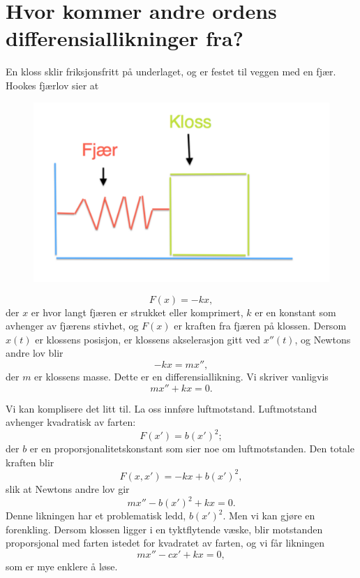 \section*{Hvor kommer andre ordens differensiallikninger fra?}
En kloss sklir friksjonsfritt p{\aa} underlaget, og er festet til veggen med en fj{\ae}r. Hookes fj{\ae}rlov sier at 
\begin{figure}[htbp]
  \begin{center}
	\includegraphics[scale=.35]{Hooke.pdf}
	\label{fig:Num1}
	\end{center}
\end{figure}
\[
F(x)=-kx,
\]
der $x$ er hvor langt fj{\ae}ren er strukket eller komprimert, 
$k$ er en konstant som avhenger av fj{\ae}rens stivhet, 
og $F(x)$ er kraften fra fj{\ae}ren p{\aa} klossen. 
Dersom $x(t)$ er klossens posisjon, er klossens akselerasjon gitt ved $x''(t)$,
og Newtons andre lov blir
\begin{equation*}
-kx=mx'',
\end{equation*}
der $m$ er klossens masse. Dette er en differensiallikning. Vi skriver vanligvis
\[
mx''+kx=0.
\]

Vi kan komplisere det litt til. La oss innf{\o}re luftmotstand. Luftmotstand avhenger kvadratisk av farten:
\begin{equation*}
F(x')=b(x')^{2};
\end{equation*}
der $b$ er en proporsjonalitetskonstant som sier noe om luftmotstanden. 
Den totale kraften blir
\begin{equation*}
F(x,x')=-kx+b(x')^{2},
\end{equation*}
slik at Newtons andre lov gir
\begin{equation*}
mx''-b(x')^{2} +kx=0.
\end{equation*}
Denne likningen har et problematisk ledd, $b(x')^{2}$. Men vi kan gjøre en forenkling. 
Dersom klossen ligger i en tyktflytende væske, blir motstanden proporsjonal med farten istedet for kvadratet av farten, 
og vi får likningen
\begin{equation*}
mx''-cx' +kx=0,
\end{equation*}
som er mye enklere å løse.



